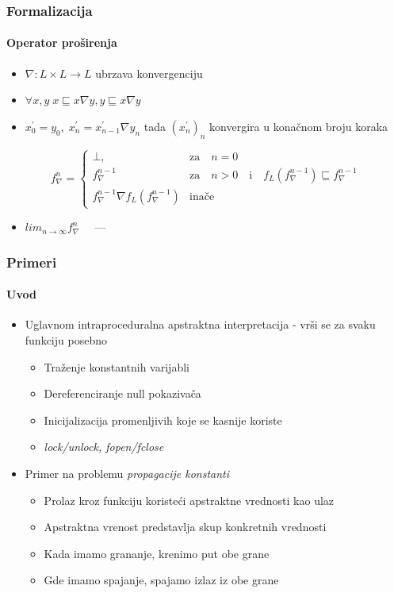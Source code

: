 \documentclass[xetex,mathserif,serif]{beamer}
\begin{document}
  \begin{frame}

    \frametitle{Formalizacija}
    \framesubtitle{Operator proširenja}
    \begin{center}
    	\begin{itemize}
    		\item $\nabla : L \times L \rightarrow L$ ubrzava konvergenciju \pause
    		\item $\forall x,\! y \; x \sqsubseteq x \nabla y, y \sqsubseteq x \nabla y$ \pause
    		\item $x^{\prime}_{0} = y_{0}, \; x^{\prime}_{n} = x^{\prime}_{n-1} \nabla y_{n}$ tada $(x^{\prime}_{n})_{n}$ konvergira u konačnom broju koraka \pause
    	\end{itemize}
    	$$
			f^{n}_{\nabla} = 
			\begin{cases}
			\bot,            								  
				& 	\text{za} \quad n = 0 \\
			f^{n-1}_{\nabla} 							      
				& \text{za} \quad n > 0 \quad \text{i} \quad f_{L}(f^{n-1}_{\nabla}) \sqsubseteq f^{n-1}_{\nabla} \\
			f^{n-1}_{\nabla} \nabla f_{L}(f^{n-1}_{\nabla})  
				& \text{inače}
			\end{cases}
		$$
		\pause
		\begin{itemize}
			\item $lim_{n \rightarrow \infty }f^{n}_{\nabla} \quad$ --- 
		\end{itemize}
	\end{center}
  \end{frame}
  \begin{frame}
    \frametitle{Primeri}
    \framesubtitle{Uvod}
    \begin{center}
		\begin{itemize}
			\item Uglavnom intraproceduralna apstraktna interpretacija - vrši se za svaku funkciju posebno
			\begin{itemize}
				\item Traženje konstantnih varijabli
				\item Dereferenciranje null pokazivača
				\item Inicijalizacija promenljivih koje se kasnije koriste
				\item \emph{lock/unlock, fopen/fclose}
			\end{itemize}
			\item Primer na problemu \emph{propagacije konstanti}
			\begin{itemize}
				\item Prolaz kroz funkciju koristeći apstraktne vrednosti kao ulaz 
				\item Apstraktna vrenost predstavlja skup konkretnih vrednosti
				\item Kada imamo grananje, krenimo put obe grane
				\item Gde imamo spajanje, spajamo izlaz iz obe grane
			\end{itemize}
		\end{itemize}
	\end{center}
  \end{frame}
\end{document}

